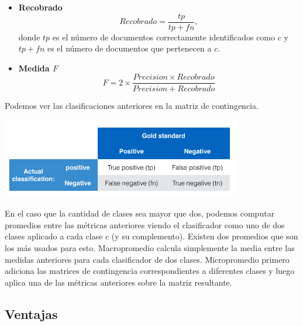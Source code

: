 \documentclass[t,compress,10pt,xcolor=dvipsnames]{beamer}
\begin{document}
{\begin{itemize}
		\framebreak	
				\item\textbf{Recobrado}
				\[
					Recobrado = \frac{tp}{tp + fn},
				\]
				donde $tp$ es el n\'umero de documentos correctamente identificados como $c$ y $tp + fn$ es el n\'umero de documentos que pertenecen a $c$.
				
				
		\framebreak	
				\item\textbf{Medida $F$} 
				$$
				F = 2 \times  \frac{Precision \times Recobrado}{Precision + Recobrado}
				$$
			\end{itemize}
			
			
			
		\framebreak	
			
			Podemos ver las clasificaciones anteriores en la matriz de contingencia. 
			
			\includegraphics[width=10.5cm]{Tabla.png}
			
		\framebreak	
					
			En el caso que la cantidad de clases sea mayor que dos, podemos computar promedios entre las m\'etricas anteriores viendo el clasificador como uno de dos clases aplicado a cada clase $c$ (y su complemento). Existen dos promedios que son los m\'as usados para esto. Macropromedio calcula simplemente la media entre las medidas anteriores para cada clasificador de dos clases. Micropromedio primero adiciona las matrices de contingencia correspondientes a diferentes clases y luego aplica una de las m\'etricas anteriores sobre la matriz resultante. 
			
				
	}
	
	\subsection{Ventajas}
	
\end{document}
